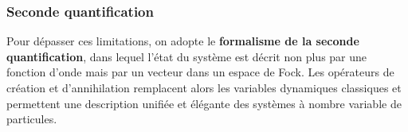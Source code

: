 \subsubsection{Seconde quantification}

Pour dépasser ces limitations, on adopte le \textbf{formalisme de la seconde quantification}, dans lequel l’état du système est décrit non plus par une fonction d’onde mais par un vecteur dans un espace de Fock. Les opérateurs de création et d’annihilation remplacent alors les variables dynamiques classiques et permettent une description unifiée et élégante des systèmes à nombre variable de particules.



